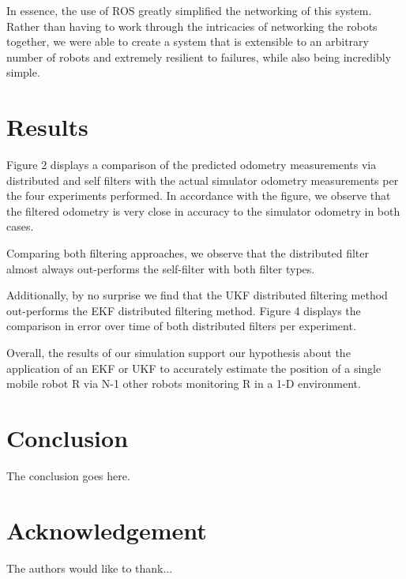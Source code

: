 \documentclass[conference]{IEEEtran}
\begin{document}
In essence, the use of ROS greatly simplified the networking of this system. Rather than having to work through the
intricacies of networking the robots together, we were able to create a system that is extensible to an arbitrary
number of robots and extremely resilient to failures, while also being incredibly simple.

\section{Results}
Figure 2 displays a comparison of the predicted odometry measurements via distributed and self filters with the actual
simulator odometry measurements per the four experiments performed. In accordance with the figure, we observe that the
filtered odometry is very close in accuracy to the simulator odometry in both cases.

 Comparing both filtering approaches, we observe that the distributed filter almost always out-performs the self-filter
 with both filter types.

Additionally, by no surprise we find that the UKF distributed filtering method out-performs the EKF distributed
filtering method. Figure 4 displays the comparison in error over time of both distributed filters per experiment.

Overall, the results of our simulation support our hypothesis about the application of an EKF or UKF to accurately
estimate the position of a single mobile robot R via N-1 other robots monitoring R in a 1-D environment.
\section{Conclusion}
The conclusion goes here.

\section*{Acknowledgement}


The authors would like to thank...



%
%
%
\printbibliography
\end{document}
